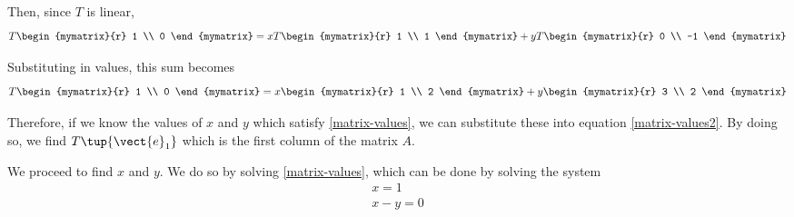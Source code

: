 {\begin{solution}
Then, since $T$ is linear,
\begin{equation*}
T\begin{mymatrix}{r}
1 \\
0 
\end{mymatrix}  = x T\begin{mymatrix}{r}
1 \\
1
\end{mymatrix} +y T\begin{mymatrix}{r}
0 \\
-1 
\end{mymatrix}
\end{equation*}

Substituting in values, this sum becomes
\begin{equation}
T\begin{mymatrix}{r}
1 \\
0 
\end{mymatrix} = 
 x\begin{mymatrix}{r}
1 \\
2
\end{mymatrix} +y\begin{mymatrix}{r}
3 \\
2
\end{mymatrix} 
\label{matrix-values2}
\end{equation}

Therefore, if we know the values of $x$ and $y$ which satisfy {\eqref{matrix-values}}, we can substitute these into equation {\eqref{matrix-values2}}. By doing so,
we find $T\tup{\vect{e}_1}$ which is the first column of the matrix $A$. 

We proceed to find $x$ and $y$. We do so by solving {\eqref{matrix-values}}, which can be done by solving the system
\begin{equation*}
\begin{array}{c}
x = 1 \\
x - y = 0
\end{array}
\end{equation*}


\end{solution}}

